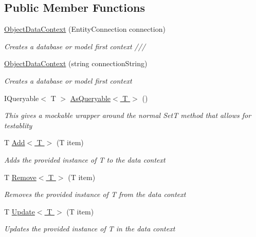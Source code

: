 \subsection*{Public Member Functions}
\begin{DoxyCompactItemize}
\item 
\hyperlink{class_highway_1_1_data_1_1_object_data_context_a64924428561bbc395c401d453406f59d}{Object\-Data\-Context} (Entity\-Connection connection)
\begin{DoxyCompactList}\small\item\em Creates a database or model first context /// \end{DoxyCompactList}\item 
\hyperlink{class_highway_1_1_data_1_1_object_data_context_a35cd7c9d33287e4f5ca4ae3ddd626b11}{Object\-Data\-Context} (string connection\-String)
\begin{DoxyCompactList}\small\item\em Creates a database or model first context \end{DoxyCompactList}\item 
I\-Queryable$<$ T $>$ \hyperlink{class_highway_1_1_data_1_1_object_data_context_afaeb4a099112573423d449aca1430531}{As\-Queryable$<$ T $>$} ()
\begin{DoxyCompactList}\small\item\em This gives a mockable wrapper around the normal Set{\itshape T}  method that allows for testablity \end{DoxyCompactList}\item 
T \hyperlink{class_highway_1_1_data_1_1_object_data_context_af6ca49358858c69c09fe1f2dc400b769}{Add$<$ T $>$} (T item)
\begin{DoxyCompactList}\small\item\em Adds the provided instance of {\itshape T}  to the data context \end{DoxyCompactList}\item 
T \hyperlink{class_highway_1_1_data_1_1_object_data_context_abd11d26a547a30aa8e9ec792cbe92bf6}{Remove$<$ T $>$} (T item)
\begin{DoxyCompactList}\small\item\em Removes the provided instance of {\itshape T}  from the data context \end{DoxyCompactList}\item 
T \hyperlink{class_highway_1_1_data_1_1_object_data_context_a40757f523d8afc84fd5ac7a9573e9f9f}{Update$<$ T $>$} (T item)
\begin{DoxyCompactList}\small\item\em Updates the provided instance of {\itshape T}  in the data context \end{DoxyCompactList}\item 

\end{DoxyCompactItemize}
